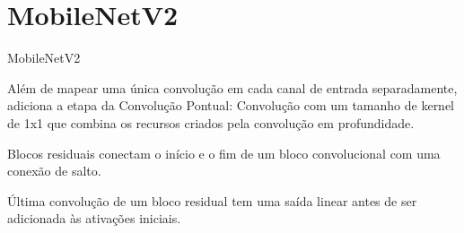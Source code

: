 \documentclass[10pt, compress]{beamer}
\begin{document}
\section{MobileNetV2} %
\begin{frame}{MobileNetV2}
  \begin{description}
    \centering
    \item[Convoluções Separáveis em Profundidade] Além de mapear uma única convolução em cada canal de entrada separadamente, adiciona a etapa da  Convolução Pontual: Convolução com um tamanho de kernel de 1x1 que combina os recursos criados pela convolução em profundidade.

    \item[Resíduos Invertidos] Blocos residuais conectam o início e o fim de um bloco convolucional com uma conexão de salto.

    \item[Gargalos] Última convolução de um bloco residual tem uma saída linear antes de ser adicionada às ativações iniciais.
  \end{description}
\end{frame}
\end{document}
